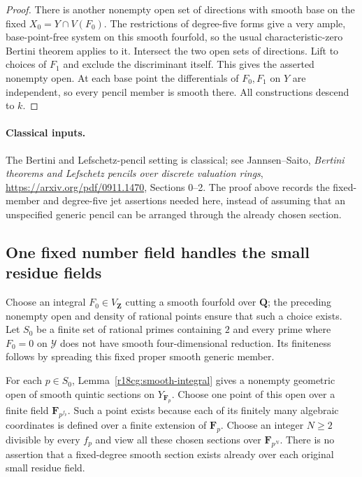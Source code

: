 \begin{proof}
There is another nonempty open set of directions with smooth
base on the fixed $X_0=Y\cap V(F_0)$.  The restrictions of
degree-five forms give a very ample, base-point-free system
on this smooth fourfold, so the usual characteristic-zero
Bertini theorem applies to it.  Intersect the two open sets
of directions.  Lift to choices of $F_1$ and exclude the
discriminant itself.  This gives the asserted nonempty open.
At each base point the differentials of $F_0,F_1$ on $Y$
are independent, so every pencil member is smooth there.
All constructions descend to $k$.
\end{proof}

\paragraph{Classical inputs.}
The Bertini and Lefschetz-pencil setting is classical; see
Jannsen--Saito, \emph{Bertini theorems and Lefschetz pencils over
discrete valuation rings}, \url{https://arxiv.org/pdf/0911.1470},
Sections 0--2.  The proof above records the fixed-member and
degree-five jet assertions needed here, instead of assuming
that an unspecified generic pencil can be arranged through
the already chosen section.

\subsection{One fixed number field handles the small residue fields}

Choose an integral $F_0\in V_{\mathbf Z}$ cutting a smooth
fourfold over $\mathbf Q$; the preceding nonempty open and
density of rational points ensure that such a choice exists.
Let $S_0$ be a finite set of rational primes containing $2$
and every prime where $F_0=0$ on $\mathcal Y$ does not have
smooth four-dimensional reduction.  Its finiteness follows
by spreading this fixed proper smooth generic member.

For each $p\in S_0$, Lemma~\ref{r18cg:smooth-integral} gives
a nonempty geometric open of smooth quintic sections on
$Y_{\mathbf F_p}$.  Choose one point of this open over a
finite field $\mathbf F_{p^{f_p}}$.  Such a point exists
because each of its finitely many algebraic coordinates is
defined over a finite extension of $\mathbf F_p$.
Choose an integer $N\ge2$ divisible by every $f_p$ and view
all these chosen sections over $\mathbf F_{p^N}$.
There is no assertion that a fixed-degree smooth section
exists already over each original small residue field.

